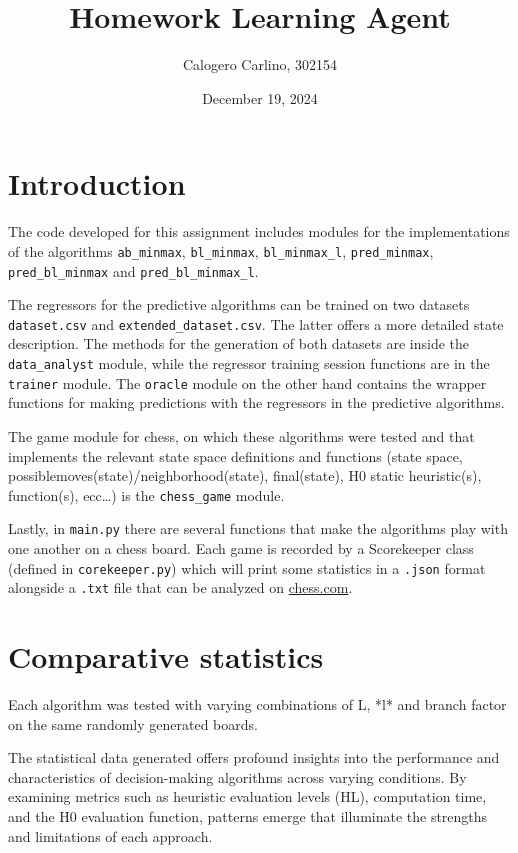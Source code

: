 \documentclass[10pt, letterpaper]{article}
\title{Homework Learning Agent}
\author{Calogero Carlino, 302154}
\date{December 19, 2024}
\begin{document}
\maketitle

\section{Introduction}
The code developed for this assignment includes modules for the 
implementations of the algorithms \texttt{ab\_minmax}, 
\texttt{bl\_minmax}, \texttt{bl\_minmax\_l},
\texttt{pred\_minmax}, \texttt{pred\_bl\_minmax} and 
\texttt{pred\_bl\_minmax\_l}.

The regressors for the predictive algorithms can be trained on two datasets \texttt{dataset.csv} and 
\texttt{extended\_dataset.csv}. The latter offers a more detailed state description. 
The methods for the generation of both datasets are inside
the \texttt{data\_analyst} module, while the regressor training session
functions are in the \texttt{trainer} module. The \texttt{oracle} module
on the other hand contains the wrapper functions for making predictions 
with the regressors in the predictive algorithms.

The game module for chess, on which these algorithms were tested and that 
implements the relevant state space definitions and functions 
(state space, possiblemoves(state)/neighborhood(state), final(state), H0 
static heuristic(s), function(s), ecc\dots) is the \texttt{chess\_game} module.

Lastly, in \texttt{main.py} there are several functions that make the algorithms play
with one another on a chess board. Each game is recorded by a Scorekeeper class
(defined in \texttt{corekeeper.py}) which will print some statistics in a \texttt{.json}
format alongside a \texttt{.txt} file that can be analyzed on \href{https://www.chess.com/analysis?tab=analysis}{chess.com}.

\section{Comparative statistics}
Each algorithm was tested with varying combinations of L, *l* and branch factor 
on the same randomly  generated boards.

The statistical data generated offers profound insights into the performance 
and characteristics of decision-making algorithms across varying conditions. 
By examining metrics such as heuristic evaluation levels (HL), computation time, 
and the H0 evaluation function, patterns emerge that illuminate the strengths 
and limitations of each approach.
\end{document}
